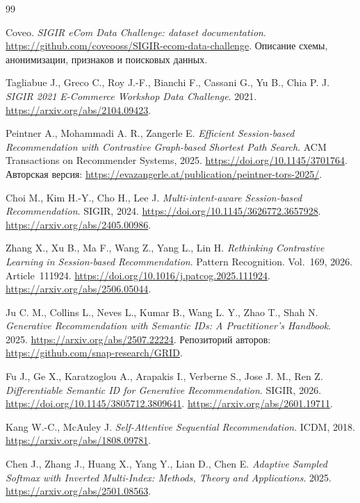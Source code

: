 \documentclass[12pt,a4paper]{article}
\theoremstyle{plainru}
\begin{document}
\begingroup
\small
\setlength{\parskip}{0pt}
\begin{thebibliography}{99}
\setlength{\itemsep}{0.3\baselineskip}

Coveo. \emph{SIGIR eCom Data Challenge: dataset documentation}.
\url{https://github.com/coveooss/SIGIR-ecom-data-challenge}.
Описание схемы, анонимизации, признаков и поисковых данных.

Tagliabue J., Greco C., Roy J.-F., Bianchi F., Cassani G., Yu B., Chia P. J.
\emph{SIGIR 2021 E-Commerce Workshop Data Challenge}.
2021. \url{https://arxiv.org/abs/2104.09423}.

Peintner A., Mohammadi A. R., Zangerle E.
\emph{Efficient Session-based Recommendation with Contrastive
Graph-based Shortest Path Search}.
ACM Transactions on Recommender Systems, 2025.
\url{https://doi.org/10.1145/3701764}.
Авторская версия:
\url{https://evazangerle.at/publication/peintner-tors-2025/}.

Choi M., Kim H.-Y., Cho H., Lee J.
\emph{Multi-intent-aware Session-based Recommendation}.
SIGIR, 2024. \url{https://doi.org/10.1145/3626772.3657928}.
\url{https://arxiv.org/abs/2405.00986}.

Zhang X., Xu B., Ma F., Wang Z., Yang L., Lin H.
\emph{Rethinking Contrastive Learning in Session-based Recommendation}.
Pattern Recognition. Vol.~169, 2026. Article~111924.
\url{https://doi.org/10.1016/j.patcog.2025.111924}.
\url{https://arxiv.org/abs/2506.05044}.

Ju C. M., Collins L., Neves L., Kumar B., Wang L. Y., Zhao T., Shah N.
\emph{Generative Recommendation with Semantic IDs: A Practitioner's Handbook}.
2025. \url{https://arxiv.org/abs/2507.22224}.
Репозиторий авторов: \url{https://github.com/snap-research/GRID}.

Fu J., Ge X., Karatzoglou A., Arapakis I., Verberne S., Jose J. M., Ren Z.
\emph{Differentiable Semantic ID for Generative Recommendation}.
SIGIR, 2026. \url{https://doi.org/10.1145/3805712.3809641}.
\url{https://arxiv.org/abs/2601.19711}.

Kang W.-C., McAuley J.
\emph{Self-Attentive Sequential Recommendation}.
ICDM, 2018. \url{https://arxiv.org/abs/1808.09781}.

Chen J., Zhang J., Huang X., Yang Y., Lian D., Chen E.
\emph{Adaptive Sampled Softmax with Inverted Multi-Index:
Methods, Theory and Applications}.
2025. \url{https://arxiv.org/abs/2501.08563}.


\end{thebibliography}
\end{document}
